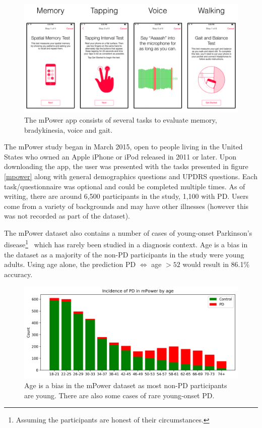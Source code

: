 \documentclass[12pt, twoside]{book}
\begin{document}
\begin{figure}[h]
\label{mpowerapp}
\centering\includegraphics[width=1\linewidth]{mpower.png}
\caption{The mPower app consists of several tasks to evaluate memory, bradykinesia, voice and gait. }
\end{figure}

The mPower study began in March 2015, open to people living in the United States who owned an Apple iPhone or iPod released in 2011 or later. Upon downloading the app, the user was presented with the tasks presented in figure \ref{mpower} along with general demographics questions and UPDRS questions. Each task/questionnaire was optional and could be completed multiple times. As of writing, there are around 6,500 participants in the study, 1,100 with PD. Users come from a variety of backgrounds and may have other illnesses (however this was not recorded as part of the dataset).

The mPower dataset also contains a number of cases of young-onset Parkinson's disease\footnote{Assuming the participants are honest of their circumstances.}~\cite{youngpd1, youngpd2} which has rarely been studied in a diagnosis context. Age is a bias in the dataset as a majority of the non-PD participants in the study were young adults. Using age alone, the prediction PD $\Leftrightarrow$ age $> 52$ would result in 86.1\% accuracy.

\addtocounter{footnote}{-1}
\begin{figure}[h]
\label{overfitex}
\centering\includegraphics[width=1\linewidth]{mpowerage.png}
\caption{Age is a bias in the mPower dataset as most non-PD participants are young. There are also some cases of rare young-onset PD\protect\footnotemark.}
\end{figure}
\end{document}
